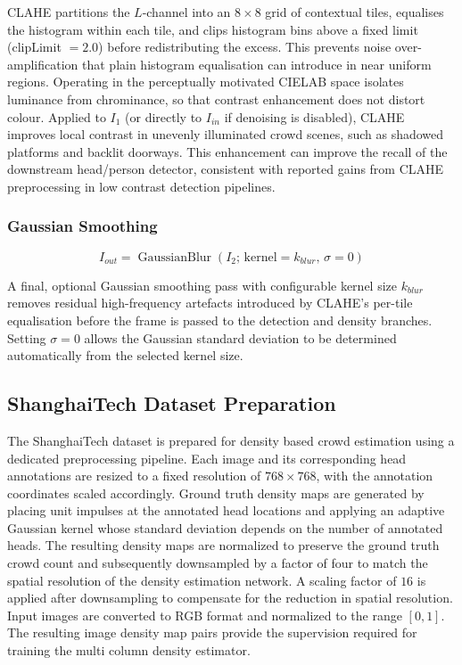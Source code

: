 CLAHE partitions the $L$-channel into an $8\times8$ grid of contextual tiles, equalises the histogram within each tile, and clips histogram bins above a fixed limit (clipLimit $=2.0$) before redistributing the excess. This prevents noise over-amplification that plain histogram equalisation can introduce in near uniform regions. Operating in the perceptually motivated CIELAB space isolates luminance from chrominance, so that contrast enhancement does not distort colour. Applied to $I_1$ (or directly to $I_{in}$ if denoising is disabled), CLAHE improves local contrast in unevenly illuminated crowd scenes, such as shadowed platforms and backlit doorways. This enhancement can improve the recall of the downstream head/person detector, consistent with reported gains from CLAHE preprocessing in low contrast detection pipelines.

\subsubsection{Gaussian Smoothing}

\begin{equation}
	I_{out} =
	\operatorname{GaussianBlur}\left(
	I_{2};\,\text{kernel}=k_{blur},\,\sigma=0
	\right)
	\label{eq:gaussian-blur}
\end{equation}

A final, optional Gaussian smoothing pass with configurable kernel size $k_{blur}$ removes residual high-frequency artefacts introduced by CLAHE's per-tile equalisation before the frame is passed to the detection and density branches. Setting $\sigma=0$ allows the Gaussian standard deviation to be determined automatically from the selected kernel size.

\subsection{ShanghaiTech Dataset Preparation}

The ShanghaiTech dataset is prepared for density based crowd estimation using a dedicated preprocessing pipeline. Each image and its corresponding head annotations are resized to a fixed resolution of $768\times768$, with the annotation coordinates scaled accordingly. Ground truth density maps are generated by placing unit impulses at the annotated head locations and applying an adaptive Gaussian kernel whose standard deviation depends on the number of annotated heads. The resulting density maps are normalized to preserve the ground truth crowd count and subsequently downsampled by a factor of four to match the spatial resolution of the density estimation network. A scaling factor of $16$ is applied after downsampling to compensate for the reduction in spatial resolution. Input images are converted to RGB format and normalized to the range $[0,1]$. The resulting image density map pairs provide the supervision required for training the multi column density estimator.

